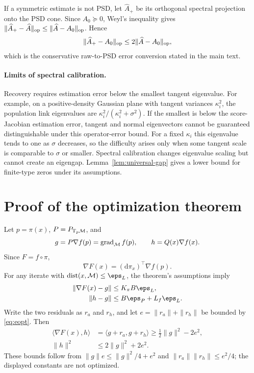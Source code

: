 If a symmetric estimate is not PSD, let $\widehat A_+$ be its orthogonal spectral projection onto the PSD cone.  Since $A_0\succeq0$, Weyl's inequality gives
$\|\widehat A_+-\widehat A\|_{\mathrm{op}}\le\|\widehat A-A_0\|_{\mathrm{op}}$.  Hence
\begin{equation}
  \|\widehat A_+-A_0\|_{\mathrm{op}}
  \le2\|\widehat A-A_0\|_{\mathrm{op}},
\end{equation}
which is the conservative raw-to-PSD error conversion stated in the main text.

\paragraph{Limits of spectral calibration.}
Recovery requires estimation error below the smallest tangent eigenvalue.  For example, on a positive-density Gaussian plane with tangent variances $\kappa_i^2$, the population link eigenvalues are
$\kappa_i^2/(\kappa_i^2+\sigma^2)$.  If the smallest is below the score-Jacobian estimation error, tangent and normal eigenvectors cannot be guaranteed distinguishable under this operator-error bound.  For a fixed $\kappa_i$ this eigenvalue tends to one as $\sigma$ decreases, so the difficulty arises only when some tangent scale is comparable to $\sigma$ or smaller.  Spectral calibration changes eigenvalue scaling but cannot create an eigengap.  Lemma~\ref{lem:universal-gap} gives a lower bound for finite-type zeros under its assumptions.

\section{Proof of the optimization theorem}
\label{app:optimization}

Let $p=\pi(x)$, $P=P_{\mathrm{T}_p\mathcal{M}}$, and
\[
  g=P\nabla f(p)=\operatorname{grad}_{\mathcal{M}} f(p),\qquad
  h=Q(x)\nabla f(x).
\]
Since $F=f\circ\pi$,
\[
  \nabla F(x)=(\mathrm d\pi_x)^\top\nabla f(p).
\]
For any iterate with $\dist(x,\M)\le\eps_L$, the theorem's assumptions imply
\begin{align}
  \|\nabla F(x)-g\|
  &\le K_\pi B\eps_L,\label{eq:opt-a}\\
  \|h-g\|
  &\le B\eps_P+L_f\eps_L.\label{eq:opt-h}
\end{align}
Write the two residuals as $r_a$ and $r_h$, and let
$e=\|r_a\|+\|r_h\|$ be bounded by \eqref{eq:eopt}.  Then
\begin{align}
  \langle\nabla F(x),h\rangle
  &=\langle g+r_a,g+r_h\rangle
  \ge\frac12\|g\|^2-2e^2,\label{eq:inner-lower}\\
  \|h\|^2&\le2\|g\|^2+2e^2.\label{eq:h-upper}
\end{align}
These bounds follow from
$\|g\|e\le\|g\|^2/4+e^2$ and
$\|r_a\|\|r_h\|\le e^2/4$; the displayed constants are not optimized.

